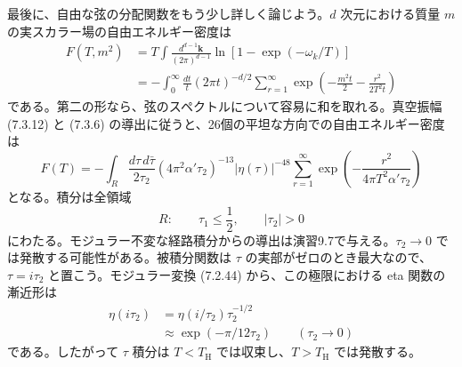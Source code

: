 最後に、自由な弦の分配関数をもう少し詳しく論じよう。$d$ 次元における質量 $m$ の実スカラー場の自由エネルギー密度は
\begin{equation}
\begin{split}
F(T,m^2)
&=T\int\frac{d^{d-1}\boldsymbol k}{(2\pi)^{d-1}}
\ln[1-\exp(-\omega_k/T)]\\
&=-\int_0^\infty\frac{dt}{t}(2\pi t)^{-d/2}
\sum_{r=1}^{\infty}\exp\left(-\frac{m^2t}{2}
-\frac{r^2}{2T^2t}\right)
\end{split}
\tag{9.8.14}\label{eq:9.8.14}
\end{equation}
である。第二の形なら、弦のスペクトルについて容易に和を取れる。真空振幅 (7.3.12) と (7.3.6) の導出に従うと、26個の平坦な方向での自由エネルギー密度は
\begin{equation}
F(T)=-\int_R\frac{d\tau\,d\bar\tau}{2\tau_2}
(4\pi^2\alpha'\tau_2)^{-13}|\eta(\tau)|^{-48}
\sum_{r=1}^{\infty}
\exp\left(-\frac{r^2}{4\pi T^2\alpha'\tau_2}\right)
\tag{9.8.15}\label{eq:9.8.15}
\end{equation}
となる。積分は全領域
\begin{equation}
R:\qquad\tau_1\leq\frac12,\qquad|\tau_2|>0
\tag{9.8.16}\label{eq:9.8.16}
\end{equation}
にわたる。モジュラー不変な経路積分からの導出は演習9.7で与える。$\tau_2\to0$ では発散する可能性がある。被積分関数は $\tau$ の実部がゼロのとき最大なので、$\tau=i\tau_2$ と置こう。モジュラー変換 (7.2.44) から、この極限における eta 関数の漸近形は
\begin{equation}
\begin{split}
\eta(i\tau_2)&=\eta(i/\tau_2)\tau_2^{-1/2}\\
&\approx\exp(-\pi/12\tau_2)
\qquad(\tau_2\to0)
\end{split}
\tag{9.8.17}\label{eq:9.8.17}
\end{equation}
である。したがって $\tau$ 積分は $T<T_{\mathrm H}$ では収束し、$T>T_{\mathrm H}$ では発散する。

